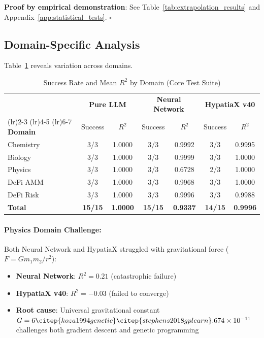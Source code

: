 \documentclass[twoside,11pt]{article}
\begin{document}
\textbf{Proof by empirical demonstration}: See Table~\ref{tab:extrapolation_results} and Appendix~\ref{app:statistical_tests}. $\square$


\subsection{Domain-Specific Analysis}

Table~\ref{tab:domain_breakdown} reveals variation across domains.

\begin{table}[htbp]
\centering
\caption{Success Rate and Mean $R^2$ by Domain (Core Test Suite)}
\label{tab:domain_breakdown}
\small
\begin{tabular}{lcccccc}
\toprule
& \multicolumn{2}{c}{\textbf{Pure LLM}} & \multicolumn{2}{c}{\textbf{Neural Network}} & \multicolumn{2}{c}{\textbf{HypatiaX v40}} \\\citep{kambhampati2024llms}
\cmidrule(lr){2-3} \cmidrule(lr){4-5} \cmidrule(lr){6-7}
\textbf{Domain} & Success & $R^2$ & Success & $R^2$ & Success & $R^2$ \\
\midrule
Chemistry   & 3/3 & 1.0000 & 3/3 & 0.9992 & 3/3 & 0.9995 \\
Biology     & 3/3 & 1.0000 & 3/3 & 0.9999 & 3/3 & 1.0000 \\
Physics     & 3/3 & 1.0000 & 3/3 & 0.6728 & 2/3 & 1.0000 \\
DeFi AMM    & 3/3 & 1.0000 & 3/3 & 0.9968 & 3/3 & 1.0000 \\
DeFi Risk   & 3/3 & 1.0000 & 3/3 & 0.9996 & 3/3 & 0.9988 \\
\midrule
\textbf{Total} & \textbf{15/15} & \textbf{1.0000} & \textbf{15/15} & \textbf{0.9337} & \textbf{14/15} & \textbf{0.9996} \\
\bottomrule
\end{tabular}
\end{table}

\paragraph{Physics Domain Challenge:} Both Neural Network and HypatiaX struggled with gravitational force ($F = Gm_1m_2/r^2$):
\begin{itemize}
\item \textbf{Neural Network}: $R^2 = 0.21$ (catastrophic failure)
\item \textbf{HypatiaX v40}: $R^2 = -0.03$ (failed to converge)
\item \textbf{Root cause}: Universal gravitational constant $G = 6\citep{koza1994genetic}\citep{stephens2018gplearn}.674 \times 10^{-11}$ challenges both gradient descent and genetic programming
\end{itemize}
\end{document}
